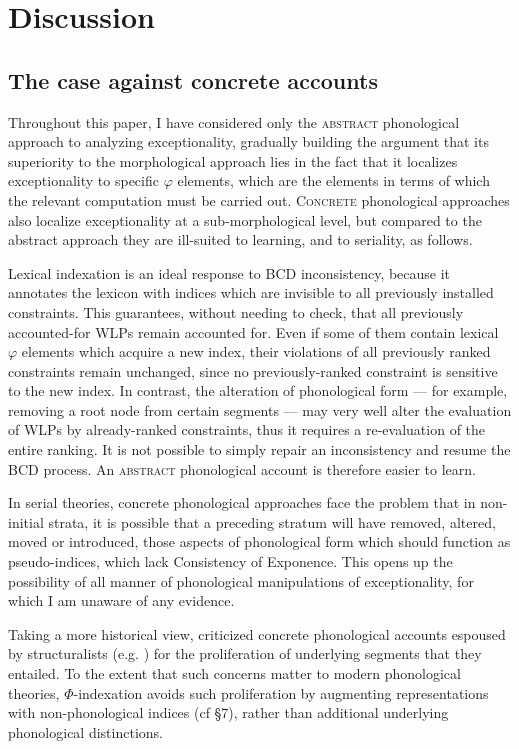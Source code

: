 \documentclass[output=paper,
modfonts
]{LSP/langsci}
\begin{document}
\section[Discussion]{Discussion}
\label{bkm:Ref335654326}\subsection[The case against concrete accounts]{The case against concrete accounts}
\label{bkm:Ref336973108}
Throughout this paper, I have considered only the \textsc{abstract} phonological approach to analyzing exceptionality, gradually building the argument that its superiority to the morphological approach lies in the fact that it localizes exceptionality to specific $\varphi $ elements, which are the elements in terms of which the relevant computation must be carried out. \textsc{Concrete} phonological approaches also localize exceptionality at a sub-morphological level, but compared to the abstract approach they are ill-suited to learning, and to seriality, as follows. 

Lexical indexation is an ideal response to BCD inconsistency, because it annotates the lexicon with indices which are invisible to all previously installed constraints. This guarantees, without needing to check, that all previously accounted-for WLPs remain accounted for. Even if some of them contain lexical $\varphi $ elements which acquire a new index, their violations of all previously ranked constraints remain unchanged, since no previously-ranked constraint is sensitive to the new index. In contrast, the alteration of phonological form — for example, removing a root node from certain segments — may very well alter the evaluation of WLPs by already-ranked constraints, thus it requires a re-evaluation of the entire ranking. It is not possible to simply repair an inconsistency and resume the BCD process. An \textsc{abstract} phonological account is therefore easier to learn. 

In serial theories, concrete phonological approaches face the problem that in non-initial strata, it is possible that a preceding stratum will have removed, altered, moved or introduced, those aspects of phonological form which should function as pseudo-indices, which lack Consistency of Exponence. This opens up the possibility of all manner of phonological manipulations of exceptionality, for which I am unaware of any evidence.

Taking a more historical view, \citet{chomsky1964} criticized concrete phonological accounts espoused by structuralists (e.g. \citealt{bloomfield1939}) for the proliferation of underlying segments that they entailed. To the extent that such concerns matter to modern phonological theories, $\Phi $-indexation avoids such proliferation by augmenting representations with non-phonological indices (cf §7), rather than additional underlying phonological distinctions. 
\end{document}
